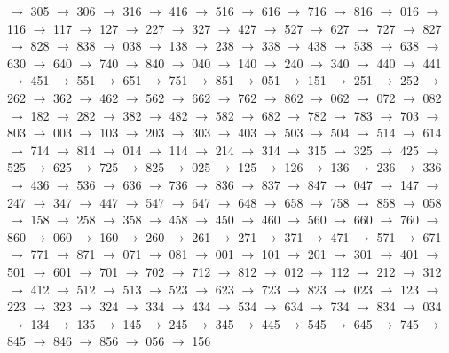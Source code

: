 $\rightarrow$ 305 $\rightarrow$ 306 $\rightarrow$ 316 $\rightarrow$ 416 $\rightarrow$ 516 $\rightarrow$ 616 $\rightarrow$ 716 $\rightarrow$ 816 $\rightarrow$ 016 $\rightarrow$ 116 $\rightarrow$ 117 $\rightarrow$ 127 $\rightarrow$ 227 $\rightarrow$ 327 $\rightarrow$ 427 $\rightarrow$ 527 $\rightarrow$ 627 $\rightarrow$ 727 $\rightarrow$ 827 $\rightarrow$ 828 $\rightarrow$ 838 $\rightarrow$ 038 $\rightarrow$ 138 $\rightarrow$ 238 $\rightarrow$ 338 $\rightarrow$ 438 $\rightarrow$ 538 $\rightarrow$ 638 $\rightarrow$ 630 $\rightarrow$ 640 $\rightarrow$ 740 $\rightarrow$ 840 $\rightarrow$ 040 $\rightarrow$ 140 $\rightarrow$ 240 $\rightarrow$ 340 $\rightarrow$ 440 $\rightarrow$ 441 $\rightarrow$ 451 $\rightarrow$ 551 $\rightarrow$ 651 $\rightarrow$ 751 $\rightarrow$ 851 $\rightarrow$ 051 $\rightarrow$ 151 $\rightarrow$ 251 $\rightarrow$ 252 $\rightarrow$ 262 $\rightarrow$ 362 $\rightarrow$ 462 $\rightarrow$ 562 $\rightarrow$ 662 $\rightarrow$ 762 $\rightarrow$ 862 $\rightarrow$ 062 $\rightarrow$ 072 $\rightarrow$ 082 $\rightarrow$ 182 $\rightarrow$ 282 $\rightarrow$ 382 $\rightarrow$ 482 $\rightarrow$ 582 $\rightarrow$ 682 $\rightarrow$ 782 $\rightarrow$ 783 $\rightarrow$ 703 $\rightarrow$ 803 $\rightarrow$ 003 $\rightarrow$ 103 $\rightarrow$ 203 $\rightarrow$ 303 $\rightarrow$ 403 $\rightarrow$ 503 $\rightarrow$ 504 $\rightarrow$ 514 $\rightarrow$ 614 $\rightarrow$ 714 $\rightarrow$ 814 $\rightarrow$ 014 $\rightarrow$ 114 $\rightarrow$ 214 $\rightarrow$ 314 $\rightarrow$ 315 $\rightarrow$ 325 $\rightarrow$ 425 $\rightarrow$ 525 $\rightarrow$ 625 $\rightarrow$ 725 $\rightarrow$ 825 $\rightarrow$ 025 $\rightarrow$ 125 $\rightarrow$ 126 $\rightarrow$ 136 $\rightarrow$ 236 $\rightarrow$ 336 $\rightarrow$ 436 $\rightarrow$ 536 $\rightarrow$ 636 $\rightarrow$ 736 $\rightarrow$ 836 $\rightarrow$ 837 $\rightarrow$ 847 $\rightarrow$ 047 $\rightarrow$ 147 $\rightarrow$ 247 $\rightarrow$ 347 $\rightarrow$ 447 $\rightarrow$ 547 $\rightarrow$ 647 $\rightarrow$ 648 $\rightarrow$ 658 $\rightarrow$ 758 $\rightarrow$ 858 $\rightarrow$ 058 $\rightarrow$ 158 $\rightarrow$ 258 $\rightarrow$ 358 $\rightarrow$ 458 $\rightarrow$ 450 $\rightarrow$ 460 $\rightarrow$ 560 $\rightarrow$ 660 $\rightarrow$ 760 $\rightarrow$ 860 $\rightarrow$ 060 $\rightarrow$ 160 $\rightarrow$ 260 $\rightarrow$ 261 $\rightarrow$ 271 $\rightarrow$ 371 $\rightarrow$ 471 $\rightarrow$ 571 $\rightarrow$ 671 $\rightarrow$ 771 $\rightarrow$ 871 $\rightarrow$ 071 $\rightarrow$ 081 $\rightarrow$ 001 $\rightarrow$ 101 $\rightarrow$ 201 $\rightarrow$ 301 $\rightarrow$ 401 $\rightarrow$ 501 $\rightarrow$ 601 $\rightarrow$ 701 $\rightarrow$ 702 $\rightarrow$ 712 $\rightarrow$ 812 $\rightarrow$ 012 $\rightarrow$ 112 $\rightarrow$ 212 $\rightarrow$ 312 $\rightarrow$ 412 $\rightarrow$ 512 $\rightarrow$ 513 $\rightarrow$ 523 $\rightarrow$ 623 $\rightarrow$ 723 $\rightarrow$ 823 $\rightarrow$ 023 $\rightarrow$ 123 $\rightarrow$ 223 $\rightarrow$ 323 $\rightarrow$ 324 $\rightarrow$ 334 $\rightarrow$ 434 $\rightarrow$ 534 $\rightarrow$ 634 $\rightarrow$ 734 $\rightarrow$ 834 $\rightarrow$ 034 $\rightarrow$ 134 $\rightarrow$ 135 $\rightarrow$ 145 $\rightarrow$ 245 $\rightarrow$ 345 $\rightarrow$ 445 $\rightarrow$ 545 $\rightarrow$ 645 $\rightarrow$ 745 $\rightarrow$ 845 $\rightarrow$ 846 $\rightarrow$ 856 $\rightarrow$ 056 $\rightarrow$ 156 